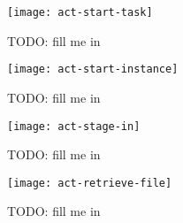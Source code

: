 \begin{figure}
  \begin{center}
    \texttt{[image: act-start-task]}
  \end{center}
  \caption[Start Task Activity]{TODO: fill me in}
  \label{fig:act-start-task}
\end{figure}

\begin{figure}
  \begin{center}
    \texttt{[image: act-start-instance]}
  \end{center}
  \caption[Start Instance Activity]{TODO: fill me in}
  \label{fig:act-start-instance}
\end{figure}

\begin{figure}
  \begin{center}
    \texttt{[image: act-stage-in]}
  \end{center}
  \caption[Stage-In Activity]{TODO: fill me in}
  \label{fig:act-stage-in}
\end{figure}

\begin{figure}
  \begin{center}
    \texttt{[image: act-retrieve-file]}
  \end{center}
  \caption[File Retrieval Activity]{TODO: fill me in}
  \label{fig:act-retrieve-file}
\end{figure}



